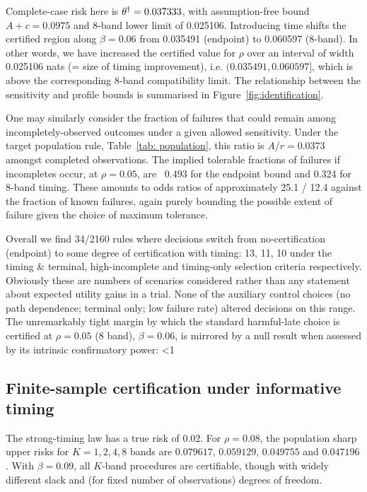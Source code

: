 \begin{table}[!htbp]\centering
\caption{Population decision value at $\rho=0.05$ and $\beta=0.06$ for the timing-and-terminal harmful-late law. Information quantities are in nats. A decision is a sharp population statement, without sampling uncertainty.}\label{tab:population}

\end{table}

Complete-case risk here is $\theta^\dagger = 0.037333$, with assumption-free bound $A+c = 0.0975$ and 8-band lower limit of 0.025106. Introducing time shifts the certified region along $\beta = 0.06$ from 0.035491 (endpoint) to 0.060597 (8-band). In other words, we have increased the certified value for $\rho$ over an interval of width 0.025106 nats (= size of timing improvement), i.e. $(0.035491,0.060597]$, which is above the corresponding 8-band compatibility limit. The relationship between the sensitivity and profile bounds is summarised in Figure~\ref{fig:identification}.

One may similarly consider the fraction of failures that could remain among incompletely-observed outcomes under a given allowed sensitivity. Under the target population rule, Table~\ref{tab: population}, this ratio is $A/r=0.0373$ amongst completed observations. The implied tolerable fractions of failures if incompletes occur, at $\rho=0.05$, are ~0.493 for the endpoint bound and 0.324 for 8-band timing. These amounts to odds ratios of approximately 25.1 / 12.4 against the fraction of known failures, again purely bounding the possible extent of failure given the choice of maximum tolerance.

Overall we find 34/2160 rules where decisions switch from no-certification (endpoint) to some degree of certification with timing: 13, 11, 10 under the timing & terminal, high-incomplete and timing-only selection criteria respectively. Obviously these are numbers of scenarios considered rather than any statement about expected utility gains in a trial. None of the auxiliary control choices (no path dependence; terminal only; low failure rate) altered decisions on this range. The unremarkably tight margin by which the standard harmful-late choice is certified at $\rho=0.05$ (8 band), $\beta=0.06$, is mirrored by a null result when assessed by its intrinsic confirmatory power: <1%
\subsection{Finite-sample certification under informative timing}
The strong-timing law has a true risk of $0.02$. For $\rho=0.08$, the population sharp upper risks for $K=1,2,4,8$ bands are $0.079617$, $0.059129$, $0.049755$ and $0.047196$. With $\beta=0.09$, all $K$-band procedures are certifiable, though with widely different slack and (for fixed number of observations) degrees of freedom.

